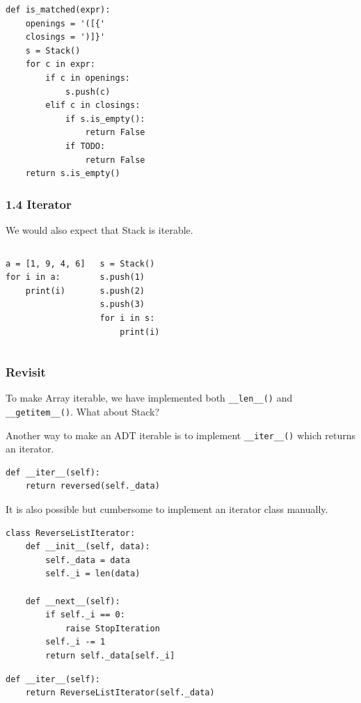 \documentclass[aspectratio=169, 14pt]{beamer}
\begin{document}
\begin{frame}[fragile]
	\begin{verbatim}
def is_matched(expr):
    openings = '([{'
    closings = ')]}'
    s = Stack()
    for c in expr:
        if c in openings:
            s.push(c)
        elif c in closings:
            if s.is_empty():
                return False
            if TODO:
                return False
    return s.is_empty()
    \end{verbatim}

\end{frame}

\begin{frame}[fragile]
	\frametitle{1.4 Iterator}
	We would also expect that \alert{Stack} is iterable.
	\begin{columns}
		\begin{verbatim}
a = [1, 9, 4, 6]
for i in a:
    print(i)    
    \end{verbatim}
		\begin{verbatim}
s = Stack()
s.push(1)
s.push(2)
s.push(3)
for i in s:
    print(i)
    \end{verbatim}

	\end{columns}
\end{frame}

\begin{frame}[fragile]
	\frametitle{Revisit}
	To make \alert{Array} iterable, we have implemented both \texttt{\_\_len\_\_()} and \texttt{\_\_getitem\_\_()}. What about \alert{Stack}?
\end{frame}

\begin{frame}[fragile]
	Another way to make an ADT iterable is to implement \texttt{\_\_iter\_\_()} which returns an iterator.

	\begin{verbatim}
def __iter__(self):
    return reversed(self._data)
    \end{verbatim}

	It is also possible but cumbersome to implement an iterator class manually.
\end{frame}

\begin{frame}[fragile]
	\begin{verbatim}
class ReverseListIterator:
    def __init__(self, data):
        self._data = data
        self._i = len(data)

    def __next__(self):
        if self._i == 0:
            raise StopIteration
        self._i -= 1
        return self._data[self._i]
    \end{verbatim}

	\begin{verbatim}
def __iter__(self):
    return ReverseListIterator(self._data)        
        \end{verbatim}
\end{frame}
\end{document}
